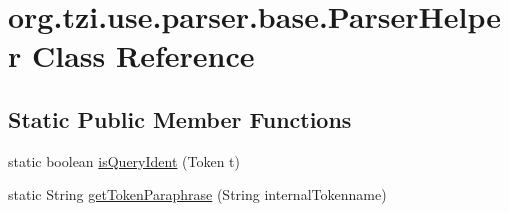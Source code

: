 \hypertarget{classorg_1_1tzi_1_1use_1_1parser_1_1base_1_1_parser_helper}{\section{org.\-tzi.\-use.\-parser.\-base.\-Parser\-Helper Class Reference}
\label{classorg_1_1tzi_1_1use_1_1parser_1_1base_1_1_parser_helper}
}
\subsection*{Static Public Member Functions}
\begin{DoxyCompactItemize}
\item 
static boolean \hyperlink{classorg_1_1tzi_1_1use_1_1parser_1_1base_1_1_parser_helper_ad8e0da1bb46ba7f5b2dfba9a3714d229}{is\-Query\-Ident} (Token t)
\item 
static String \hyperlink{classorg_1_1tzi_1_1use_1_1parser_1_1base_1_1_parser_helper_a83d7dfffab613ed373d8828098abc33d}{get\-Token\-Paraphrase} (String internal\-Tokenname)
\end{DoxyCompactItemize}
